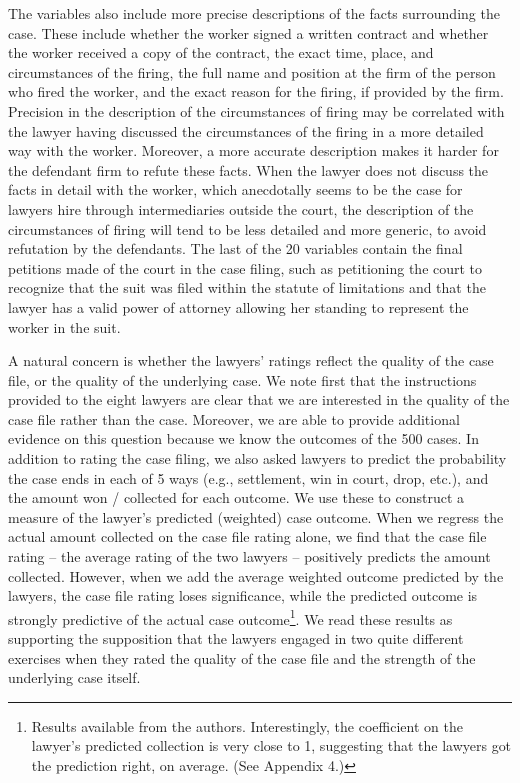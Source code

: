 \documentclass[oneside,12pt]{article}
\begin{document}
The variables also include more precise descriptions of the facts surrounding the case. These include whether the worker signed a written contract and whether the worker received a copy of the contract, the exact time, place, and circumstances of the firing, the full name and position at the firm of the person who fired the worker, and the exact reason for the firing, if provided by the firm. Precision in the description of the circumstances of firing may be correlated with the lawyer having discussed the circumstances of the firing in a more detailed way with the worker. Moreover, a more accurate description makes it harder for the defendant firm to refute these facts. When the lawyer does not discuss the facts in detail with the worker, which anecdotally seems to be the case for lawyers hire through intermediaries outside the court, the description of the circumstances of firing will tend to be less detailed and more generic, to avoid refutation by the defendants. The last of the 20 variables contain the final petitions made of the court in the case filing, such as petitioning the court to recognize that the suit was filed within the statute of limitations and that the lawyer has a valid power of attorney allowing her standing to represent the worker in the suit. 

A natural concern is whether the lawyers’ ratings reflect the quality of the case file, or the quality of the underlying case. We note first that the instructions provided to the eight lawyers are clear that we are interested in the quality of the case file rather than the case. Moreover, we are able to provide additional evidence on this question because we know the outcomes of the 500 cases. In addition to rating the case filing, we also asked lawyers to predict the probability the case ends in each of 5 ways (e.g., settlement, win in court, drop, etc.), and the amount won / collected for each outcome. We use these to construct a measure of the lawyer’s predicted (weighted) case outcome. When we regress the actual amount collected on the case file rating alone, we find that the case file rating – the average rating of the two lawyers – positively predicts the amount collected. However, when we add the average weighted outcome predicted by the lawyers, the case file rating loses significance, while the predicted outcome is strongly predictive of the actual case outcome\footnote{Results available from the authors. Interestingly, the coefficient on the lawyer’s predicted collection is very close to 1, suggesting that the lawyers got the prediction right, on average. (See Appendix 4.)}.  We read these results as supporting the supposition that the lawyers engaged in two quite different exercises when they rated the quality of the case file and the strength of the underlying case itself. 
\end{document}
